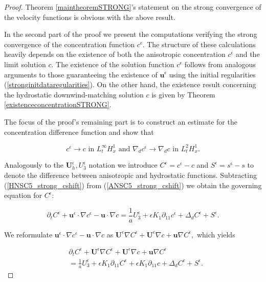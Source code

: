 \documentclass[11pt]{article}
\begin{document}
\begin{proof}
Theorem \ref{maintheoremSTRONG}'s statement on the strong convergence of the velocity functions is obvious with the above result.

In the second part of the proof we present the computations verifying the strong convergence of the concentration function $c^\epsilon.$ The structure of these calculations heavily depends on the existence of both the anisotropic concentration $c^\epsilon$ and the limit solution $c.$ The existence of the solution function $c^\epsilon$ follows from analogous arguments to those guaranteeing the existence of $\mathbf{u}^\epsilon$ using the initial regularities (\ref{stronginitdataregularities}). On the other hand, the existence result concerning the hydrostatic downwind-matching solution $c$ is given by Theorem \ref{existenceconcentrationSTRONG}.

The focus of the proof's remaining part is to construct an estimate for the concentration difference function and show that

\begin{equation}
c^\epsilon \to c \text{ in } L_t^\infty H_x^1 \text{ and } \nabla_d c^\epsilon \to \nabla_d c \text{ in } L_t^2 H_x^1.
\end{equation}

Analogously to the $\mathbf{U}_h^\epsilon, U_3^\epsilon$ notation we introduce $C^\epsilon = c^\epsilon-c$ and $S^\epsilon = s^\epsilon-s$ to denote the difference between anisotropic and hydrostatic functions. Subtracting (\ref{HNSC5_strong_cshift}) from (\ref{ANSC5_strong_cshift}) we obtain the governing equation for $C^\epsilon:$

\begin{equation}
\partial_t C^\epsilon + \mathbf{u}^\epsilon \cdot \nabla c^\epsilon - \mathbf{u} \cdot \nabla c = \frac{1}{a} U_3^\epsilon + \epsilon K_1 \partial_{11} c^\epsilon + \Delta_d C^\epsilon + S^\epsilon.
\end{equation}

We reformulate $\mathbf{u}^\epsilon \cdot \nabla c^\epsilon - \mathbf{u} \cdot \nabla c$ as $\mathbf{U}^\epsilon \nabla C^\epsilon + \mathbf{U}^\epsilon \nabla c+ \mathbf{u} \nabla C^\epsilon,$ which yields

\begin{equation} \label{governCepsilon}
\begin{split}
& \partial_t C^\epsilon + \mathbf{U}^\epsilon \nabla C^\epsilon + \mathbf{U}^\epsilon \nabla c+ \mathbf{u} \nabla C^\epsilon \\
& = \frac{1}{a} U_3^\epsilon + \epsilon K_1 \partial_{11} C^\epsilon + \epsilon K_1 \partial_{11} c + \Delta_d C^\epsilon + S^\epsilon.
\end{split}
\end{equation}


\end{proof}
\end{document}
